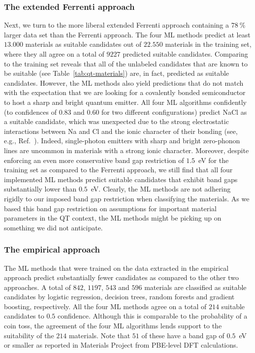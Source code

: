 \documentclass[superscriptaddress,unsortedaddress,
 amsmath,amssymb,
 aps,
]{revtex4-2}
\begin{document}
\subsubsection*{The extended Ferrenti approach}
Next, we turn to the more liberal extended Ferrenti approach containing a $78 \ \%$ larger 
data set 
than the Ferrenti approach.  
The four ML methods predict at least $13.000$ materials as suitable candidates out of $22.550$ materials in the training set, where they all agree on a total of $9227$ predicted suitable candidates. Comparing to the training set reveals that all of the unlabeled candidates that are known to be suitable (see Table~\ref{tab:qt-materials}) are, in fact, predicted as suitable candidates. 
However, the ML methods also yield predictions that do not match with the expectation that we are looking for a covalently bonded semiconductor to host a sharp and bright quantum emitter. 
% 
All four ML algorithms confidently (to confidences of $0.83$ and $0.60$ for two different configurations) predict NaCl as a suitable candidate, which was unexpected due to the strong electrostatic interactions between Na and Cl and the ionic character of their bonding (see, e.g., Ref.~\cite{Weber2010}).  
Indeed, single-photon emitters with sharp and bright zero-phonon lines are uncommon in materials with a strong ionic character. 
Moreover, despite enforcing an even more conservative band gap restriction of $1.5$~eV for the training set as compared to the Ferrenti approach, we still find that all four implemented ML methods predict suitable candidates that exhibit band gaps substantially lower than $0.5$~eV.
Clearly, the ML methods are not adhering rigidly to our imposed band gap restriction when classifying the materials. 
As we based this band gap restriction on assumptions for important material parameters in the QT context, the ML methods might be picking up on something we did not anticipate. 

 
\subsubsection*{The empirical approach}
The ML methods that were trained on the data extracted in the empirical approach predict substantially fewer candidates as compared to the other two approaches. 
A total of $842$, $1197$, $543$ and $596$ materials are classified as suitable candidates by logistic regression, decision trees, random forests and gradient boosting, respectively. All the four ML methods agree on a total of $214$ suitable candidates to $0.5$ confidence.   
Although this is comparable to the probability of a coin toss, the agreement of the four ML algorithms lends support to the suitability of the $214$ materials. 
Note that $51$ of these have a band gap of $0.5$~eV or smaller as reported in Materials Project from PBE-level DFT calculations.   
\end{document}
